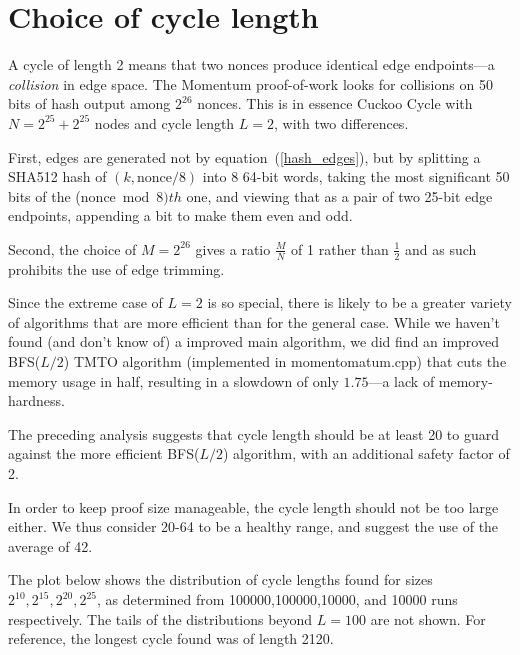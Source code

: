 \documentclass[11pt, oneside]{article}
\begin{document}
\section{Choice of cycle length}
\label{cycle_length_choice}
A cycle of length 2 means that two nonces produce identical edge endpoints---a {\em collision} in edge space.
The Momentum proof-of-work looks for collisions on 50 bits of hash output among $2^{26}$ nonces.
This is in essence Cuckoo Cycle with $N=2^{25}+2^{25}$ nodes and cycle length $L=2$, with
two differences.

First, edges are generated not by equation~(\ref{hash_edges}), but by splitting a SHA512 hash of
$(k,\mbox{nonce} / 8)$ into 8 64-bit words, taking the most significant 50 bits of the
($\mbox{nonce} \bmod 8)th$ one, and viewing that as a pair of two 25-bit edge endpoints, appending
a bit to make them even and odd.

Second, the choice of $M=2^{26}$ gives a ratio $\frac{M}{N}$ of 1 rather than $\frac{1}{2}$ and as such
prohibits the use of edge trimming.

Since the extreme case of $L=2$ is so special, there is likely to be a greater variety of algorithms that are more
efficient than for the general case. While we haven't found (and don't know of) a improved main algorithm,
we did find an improved BFS($L/2$) TMTO algorithm (implemented in momentomatum.cpp)
that cuts the memory usage in half, resulting in a slowdown of only $1.75$---a lack of memory-hardness.

The preceding analysis suggests that cycle length should be at least 20 to guard against the more efficient
BFS($L/2$) algorithm, with an additional safety factor of 2.

In order to keep proof size manageable, the cycle length should not be too large either.
We thus consider 20-64 to be a healthy range, and suggest the use of the average of 42.

The plot below shows the distribution of cycle lengths found for sizes $2^{10},2^{15},2^{20},2^{25}$,
as determined from 100000,100000,10000, and 10000 runs respectively. The tails of the distributions
beyond $L=100$ are not shown. For reference, the longest cycle found was of length 2120.
\end{document}
